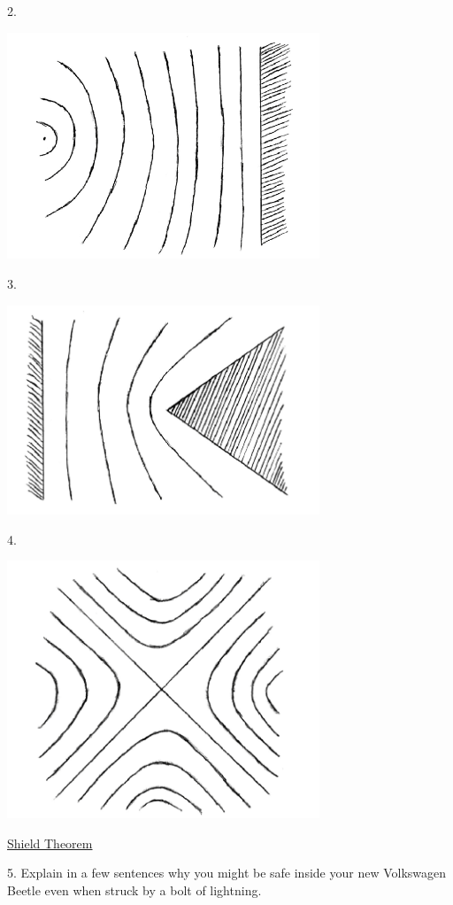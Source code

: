 \begin{minipage}[h]{0.95\textwidth}
    2.\begin{center}
        \includegraphics[width=0.7\textwidth]{./Exp1/pic/image10.png}
    \end{center}
\end{minipage}

\begin{minipage}[h]{0.95\textwidth}
    3.\begin{center}
        \includegraphics[width=0.7\textwidth]{./Exp1/pic/image11.png}
    \end{center}
\end{minipage}

\begin{minipage}[h]{0.95\textwidth}
    4.\begin{center}
        \includegraphics[width=0.7\textwidth]{./Exp1/pic/image12.png}
    \end{center}
\end{minipage}

\noindent\underline{Shield Theorem} \myskip

5. Explain in a few sentences why you might be safe inside your new Volkswagen Beetle even when struck by a bolt of lightning.
